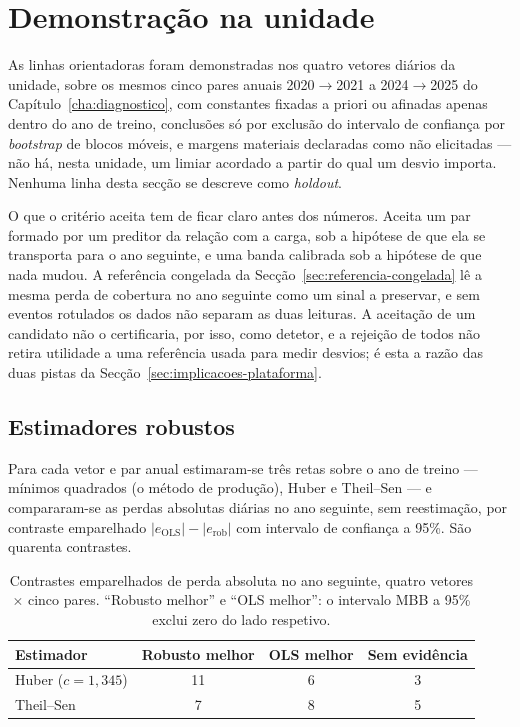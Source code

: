 \section{Demonstração na unidade}
\label{sec:demonstracao}

As linhas orientadoras foram demonstradas nos quatro vetores diários da
unidade, sobre os mesmos cinco pares anuais 2020${\to}$2021 a
2024${\to}$2025 do Capítulo~\ref{cha:diagnostico}, com constantes fixadas a
priori ou afinadas apenas dentro do ano de treino, conclusões só por
exclusão do intervalo de confiança por \emph{bootstrap} de blocos móveis, e
margens materiais declaradas como não elicitadas --- não há, nesta unidade,
um limiar acordado a partir do qual um desvio importa. Nenhuma linha desta
secção se descreve como \emph{holdout}.

O que o critério aceita tem de ficar claro antes dos números. Aceita um par
formado por um preditor da relação com a carga, sob a hipótese de que ela se
transporta para o ano seguinte, e uma banda calibrada sob a hipótese de que
nada mudou. A referência congelada da Secção~\ref{sec:referencia-congelada}
lê a mesma perda de cobertura no ano seguinte como um sinal a preservar, e
sem eventos rotulados os dados não separam as duas leituras. A aceitação de
um candidato não o certificaria, por isso, como detetor, e a rejeição de
todos não retira utilidade a uma referência usada para medir desvios; é
esta a razão das duas pistas da Secção~\ref{sec:implicacoes-plataforma}.

\subsection{Estimadores robustos}
\label{sec:demo-robustos}

Para cada vetor e par anual estimaram-se três retas sobre o ano de treino
--- mínimos quadrados (o método de produção), Huber e Theil--Sen --- e
compararam-se as perdas absolutas diárias no ano seguinte, sem reestimação,
por contraste emparelhado $|e_{\mathrm{OLS}}| - |e_{\mathrm{rob}}|$ com
intervalo de confiança a 95\%. São quarenta contrastes.

\begin{table}[htbp]
  \centering
  \caption[Estimadores robustos contra mínimos quadrados]{Contrastes
  emparelhados de perda absoluta no ano seguinte, quatro vetores $\times$
  cinco pares. ``Robusto melhor'' e ``OLS melhor'': o intervalo MBB a 95\%
  exclui zero do lado respetivo.}
  \label{tab:robustos}
  \begin{tabular}{lccc}
    \toprule
    Estimador & Robusto melhor & OLS melhor & Sem evidência \\
    \midrule
    Huber ($c = 1{,}345$) & 11 & 6 & 3 \\
    Theil--Sen            & 7  & 8 & 5 \\
    \bottomrule
  \end{tabular}
\end{table}

